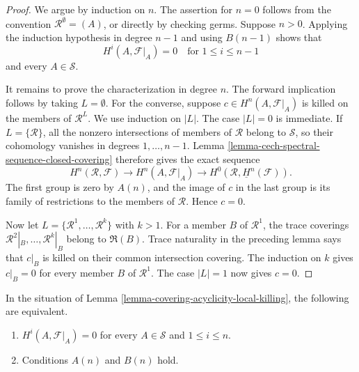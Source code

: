 \begin{proof}
We argue by induction on $n$. The assertion for $n=0$ follows from the
convention $\mathcal R^\emptyset=(A)$, or directly by checking germs.
Suppose $n>0$. Applying the induction hypothesis in degree $n-1$ and using
$B(n-1)$ shows that
$$
H^i(A,\mathcal F|_A)=0
\quad\text{for }1\leq i\leq n-1
$$
and every $A\in\mathcal S$.

It remains to prove the characterization in degree $n$. The forward
implication follows by taking $L=\emptyset$. For the converse, suppose
$c\in H^n(A,\mathcal F|_A)$ is killed on the members of
$\mathcal R^L$. We use induction on $|L|$. The case $|L|=0$ is immediate.
If $L=\{\mathcal R\}$, all the nonzero intersections of members of
$\mathcal R$ belong to $\mathcal S$, so their cohomology vanishes in
degrees $1,\ldots,n-1$. Lemma
\ref{lemma-cech-spectral-sequence-closed-covering} therefore gives the exact
sequence
$$
H^n(\mathcal R,\mathcal F)\longrightarrow
H^n(A,\mathcal F|_A)\longrightarrow
H^0(\mathcal R,\underline H^n(\mathcal F)).
$$
The first group is zero by $A(n)$, and the image of $c$ in the last group
is its family of restrictions to the members of $\mathcal R$. Hence $c=0$.

Now let $L=\{\mathcal R^1,\ldots,\mathcal R^k\}$ with $k>1$. For a member
$B$ of $\mathcal R^1$, the trace coverings
$\mathcal R^2|_B,\ldots,\mathcal R^k|_B$ belong to $\mathfrak R(B)$.
Trace naturality in the preceding lemma says that $c|_B$ is killed on their
common intersection covering. The induction on $k$ gives $c|_B=0$ for
every member $B$ of $\mathcal R^1$. The case $|L|=1$ now gives $c=0$.
\end{proof}

\begin{lemma}
\label{lemma-covering-acyclicity-conditions}
\begin{reference}
\cite[Chapter III, \S 3.9, Corollary 1 to Theorem 3.9.1,
p. 179]{Tohoku}
\end{reference}
In the situation of Lemma
\ref{lemma-covering-acyclicity-local-killing}, the following are equivalent.
\begin{enumerate}
\item $H^i(A,\mathcal F|_A)=0$ for every $A\in\mathcal S$ and
$1\leq i\leq n$.
\item Conditions $A(n)$ and $B(n)$ hold.
\end{enumerate}
\end{lemma}

